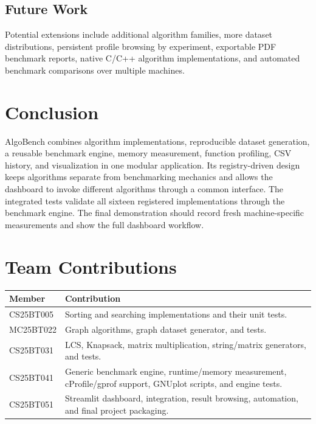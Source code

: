 \documentclass[11pt,a4paper]{report}
\begin{document}
\section{Future Work}
Potential extensions include additional algorithm families, more dataset
distributions, persistent profile browsing by experiment, exportable PDF
benchmark reports, native C/C++ algorithm implementations, and automated
benchmark comparisons over multiple machines.

\chapter{Conclusion}
AlgoBench combines algorithm implementations, reproducible dataset generation,
a reusable benchmark engine, memory measurement, function profiling, CSV
history, and visualization in one modular application. Its registry-driven
design keeps algorithms separate from benchmarking mechanics and allows the
dashboard to invoke different algorithms through a common interface. The
integrated tests validate all sixteen registered implementations through the
benchmark engine. The final demonstration should record fresh machine-specific
measurements and show the full dashboard workflow.

\chapter*{Team Contributions}
\begin{longtable}{p{}p{}}
\toprule
\textbf{Member} & \textbf{Contribution}\\
\midrule
CS25BT005 & Sorting and searching implementations and their unit tests.\\
MC25BT022 & Graph algorithms, graph dataset generator, and tests.\\
CS25BT031 & LCS, Knapsack, matrix multiplication, string/matrix generators, and tests.\\
CS25BT041 & Generic benchmark engine, runtime/memory measurement, cProfile/gprof support, GNUplot scripts, and engine tests.\\
CS25BT051 & Streamlit dashboard, integration, result browsing, automation, and final project packaging.\\
\bottomrule
\end{longtable}
\end{document}
